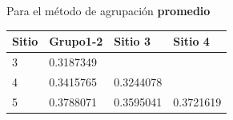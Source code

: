 \documentclass[]{book}
\begin{document}
Para el método de agrupación \textbf{promedio}

\begin{longtable}[]{@{}llll@{}}
\toprule
\begin{minipage}[b]{0.09\columnwidth}\raggedright\strut
Sitio\strut
\end{minipage} & \begin{minipage}[b]{0.15\columnwidth}\raggedright\strut
Grupo1-2\strut
\end{minipage} & \begin{minipage}[b]{0.14\columnwidth}\raggedright\strut
Sitio 3\strut
\end{minipage} & \begin{minipage}[b]{0.15\columnwidth}\raggedright\strut
Sitio 4\strut
\end{minipage}\tabularnewline
\midrule
\endhead
\begin{minipage}[t]{0.09\columnwidth}\raggedright\strut
3\strut
\end{minipage} & \begin{minipage}[t]{0.15\columnwidth}\raggedright\strut
0.3187349\strut
\end{minipage} & \begin{minipage}[t]{0.14\columnwidth}\raggedright\strut
\strut
\end{minipage} & \begin{minipage}[t]{0.15\columnwidth}\raggedright\strut
\strut
\end{minipage}\tabularnewline
\begin{minipage}[t]{0.09\columnwidth}\raggedright\strut
4\strut
\end{minipage} & \begin{minipage}[t]{0.15\columnwidth}\raggedright\strut
0.3415765\strut
\end{minipage} & \begin{minipage}[t]{0.14\columnwidth}\raggedright\strut
0.3244078\strut
\end{minipage} & \begin{minipage}[t]{0.15\columnwidth}\raggedright\strut
\strut
\end{minipage}\tabularnewline
\begin{minipage}[t]{0.09\columnwidth}\raggedright\strut
5\strut
\end{minipage} & \begin{minipage}[t]{0.15\columnwidth}\raggedright\strut
0.3788071\strut
\end{minipage} & \begin{minipage}[t]{0.14\columnwidth}\raggedright\strut
0.3595041\strut
\end{minipage} & \begin{minipage}[t]{0.15\columnwidth}\raggedright\strut
0.3721619\strut
\end{minipage}\tabularnewline
\bottomrule
\end{longtable}
\end{document}
